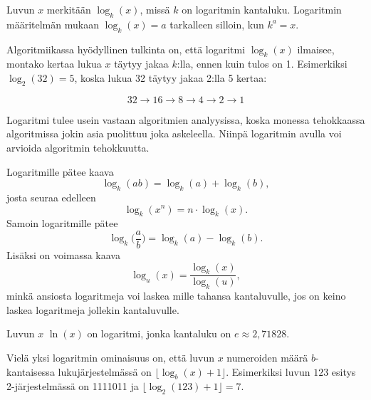 
Luvun $x$
 merkitään $\log_k(x)$, missä $k$ on logaritmin kantaluku.
Logaritmin määritelmän mukaan
$\log_k(x)=a$ tarkalleen silloin, kun $k^a=x$.

Algoritmiikassa hyödyllinen tulkinta on,
että logaritmi $\log_k(x)$ ilmaisee, montako kertaa lukua $x$
täytyy jakaa $k$:lla, ennen kuin tulos on 1.
Esimerkiksi $\log_2(32)=5$,
koska lukua 32 täytyy jakaa 2:lla 5 kertaa:

\[32 \rightarrow 16 \rightarrow 8 \rightarrow 4 \rightarrow 2 \rightarrow 1 \]

Logaritmi tulee usein vastaan algoritmien analyysissa,
koska monessa tehokkaassa algoritmissa jokin asia puolittuu
joka askeleella.
Niinpä logaritmin avulla voi arvioida algoritmin tehokkuutta.

Logaritmille pätee kaava
\[\log_k(ab) = \log_k(a)+\log_k(b),\]
josta seuraa edelleen
\[\log_k(x^n) = n \cdot \log_k(x).\]
Samoin logaritmille pätee
\[\log_k\Big(\frac{a}{b}\Big) = \log_k(a)-\log_k(b).\]
Lisäksi on voimassa kaava
\[\log_u(x) = \frac{\log_k(x)}{\log_k(u)},\]
minkä ansiosta logaritmeja voi laskea mille tahansa kantaluvulle,
jos on keino laskea logaritmeja jollekin kantaluvulle.


Luvun $x$  $\ln(x)$ on logaritmi, jonka kantaluku on
 $e \approx 2{,}71828$.

Vielä yksi logaritmin ominaisuus on, että
luvun $x$ numeroiden määrä $b$-kantaisessa
lukujärjestelmässä
on $\lfloor \log_b(x)+1 \rfloor$.
Esimerkiksi luvun $123$ esitys
2-järjestelmässä on 1111011 ja
$\lfloor \log_2(123)+1 \rfloor = 7$.

